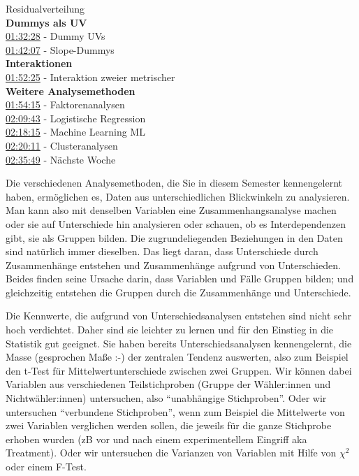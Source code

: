 \documentclass[
  10pt,
  letterpaper,
  a4paper, twoside]{scrreprt}
\begin{document}
Residualverteilung\\
\textbf{Dummys als UV}\\
\href{https://www.youtube.com/watch?v=gz0x-WSROe4&t=5548s}{01:32:28} -
Dummy UVs\\
\href{https://www.youtube.com/watch?v=gz0x-WSROe4&t=6127s}{01:42:07} -
Slope-Dummys\\
\textbf{Interaktionen}\\
\href{https://www.youtube.com/watch?v=gz0x-WSROe4&t=6745s}{01:52:25} -
Interaktion zweier metrischer\\
\textbf{Weitere Analysemethoden}\\
\href{https://www.youtube.com/watch?v=gz0x-WSROe4&t=6855s}{01:54:15} -
Faktorenanalysen\\
\href{https://www.youtube.com/watch?v=gz0x-WSROe4&t=7783s}{02:09:43} -
Logistische Regression\\
\href{https://www.youtube.com/watch?v=gz0x-WSROe4&t=8295s}{02:18:15} -
Machine Learning ML\\
\href{https://www.youtube.com/watch?v=gz0x-WSROe4&t=8411s}{02:20:11} -
Clusteranalysen\\
\href{https://www.youtube.com/watch?v=gz0x-WSROe4&t=9349s}{02:35:49} -
Nächste Woche

Die verschiedenen Analysemethoden, die Sie in diesem Semester
kennengelernt haben, ermöglichen es, Daten aus unterschiedlichen
Blickwinkeln zu analysieren. Man kann also mit denselben Variablen eine
Zusammenhangsanalyse machen oder sie auf Unterschiede hin analysieren
oder schauen, ob es Interdependenzen gibt, sie als Gruppen bilden. Die
zugrundeliegenden Beziehungen in den Daten sind natürlich immer
dieselben. Das liegt daran, dass Unterschiede durch Zusammenhänge
entstehen und Zusammenhänge aufgrund von Unterschieden. Beides finden
seine Ursache darin, dass Variablen und Fälle Gruppen bilden; und
gleichzeitig entstehen die Gruppen durch die Zusammenhänge und
Unterschiede.

Die Kennwerte, die aufgrund von Unterschiedsanalysen entstehen sind
nicht sehr hoch verdichtet. Daher sind sie leichter zu lernen und für
den Einstieg in die Statistik gut geeignet. Sie haben bereits
Unterschiedsanalysen kennengelernt, die Masse (gesprochen Maße :-) der
zentralen Tendenz auswerten, also zum Beispiel den t-Test für
Mittelwertunterschiede zwischen zwei Gruppen. Wir können dabei Variablen
aus verschiedenen Teilstichproben (Gruppe der Wähler:innen und
Nichtwähler:innen) untersuchen, also \enquote{unabhängige Stichproben}.
Oder wir untersuchen \enquote{verbundene Stichproben}, wenn zum Beispiel
die Mittelwerte von zwei Variablen verglichen werden sollen, die jeweils
für die ganze Stichprobe erhoben wurden (zB vor und nach einem
experimentellem Eingriff aka Treatment). Oder wir untersuchen die
Varianzen von Variablen mit Hilfe von \(\chi^2\) oder einem F-Test.
\end{document}
